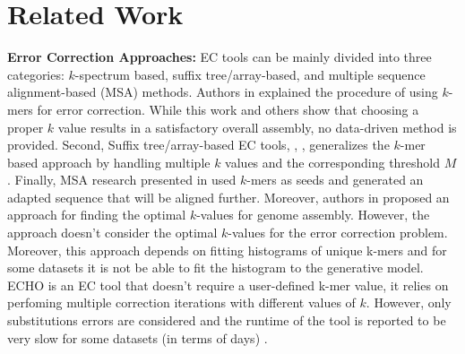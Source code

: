 \vspace{-12pt}
\section{Related Work}
\vspace{-12pt}
\textbf{Error Correction Approaches:} EC tools can be mainly divided into three categories: $k$-spectrum based, suffix tree/array-based, and multiple sequence alignment-based (MSA) methods. Authors in \cite{pevzner2001eulerian} explained the procedure of using $k$-mers for error correction. %
While this work and others show that choosing a proper $k$ value results in a satisfactory overall assembly, no data-driven method is provided. Second, Suffix tree/array-based EC tools, \eg, \cite{ilie2010hitec}, generalizes the $k$-mer based approach by handling multiple $k$ values and the corresponding threshold $M$. Finally, MSA research presented in \cite{salmela2011correcting} used $k$-mers as seeds and generated an adapted sequence that will be aligned further. Moreover, authors in \cite{chikhi2013informed} proposed an approach for finding the optimal $k$-values for genome assembly. However, the approach doesn't consider the optimal $k$-values for the error correction problem. Moreover, this approach depends on fitting histograms of unique k-mers and for some datasets it is not be able to fit the histogram to the generative model. ECHO \cite{kao2011echo} is an EC tool that doesn't require a user-defined k-mer value, it relies on perfoming multiple correction iterations with different values of $k$. However, only substitutions errors are considered and the runtime of the tool is reported to be very slow for some datasets (in terms of days) \cite{yang2012survey}. %
